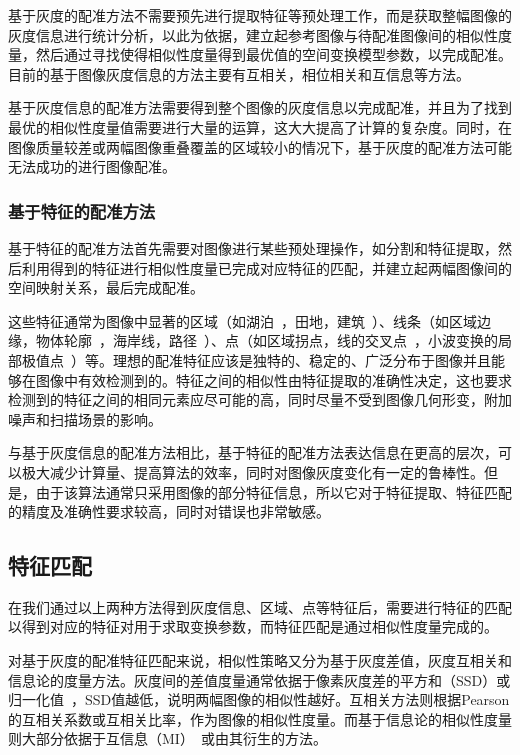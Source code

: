 基于灰度的配准方法不需要预先进行提取特征等预处理工作，而是获取整幅图像的灰度信息进行统计分析，以此为依据，建立起参考图像与待配准图像间的相似性度量，然后通过寻找使得相似性度量得到最优值的空间变换模型参数，以完成配准。目前的基于图像灰度信息的方法主要有互相关，相位相关和互信息等方法。

基于灰度信息的配准方法需要得到整个图像的灰度信息以完成配准，并且为了找到最优的相似性度量值需要进行大量的运算，这大大提高了计算的复杂度。同时，在图像质量较差或两幅图像重叠覆盖的区域较小的情况下，基于灰度的配准方法可能无法成功的进行图像配准。

\subsubsection{ 基于特征的配准方法}

基于特征的配准方法首先需要对图像进行某些预处理操作，如分割和特征提取，然后利用得到的特征进行相似性度量已完成对应特征的匹配，并建立起两幅图像间的空间映射关系，最后完成配准。

这些特征通常为图像中显著的区域（如湖泊~\cite{helm}，田地，建筑~\cite{hsieh}）、线条（如区域边缘，物体轮廓~\cite{dai}，海岸线，路径~\cite{li}）、点（如区域拐点，线的交叉点~\cite{stock}，小波变换的局部极值点~\cite{serief}）等。理想的配准特征应该是独特的、稳定的、广泛分布于图像并且能够在图像中有效检测到的。特征之间的相似性由特征提取的准确性决定，这也要求检测到的特征之间的相同元素应尽可能的高，同时尽量不受到图像几何形变，附加噪声和扫描场景的影响。

与基于灰度信息的配准方法相比，基于特征的配准方法表达信息在更高的层次，可以极大减少计算量、提高算法的效率，同时对图像灰度变化有一定的鲁棒性。但是，由于该算法通常只采用图像的部分特征信息，所以它对于特征提取、特征匹配的精度及准确性要求较高，同时对错误也非常敏感。

\subsection{特征匹配}
在我们通过以上两种方法得到灰度信息、区域、点等特征后，需要进行特征的匹配以得到对应的特征对用于求取变换参数，而特征匹配是通过相似性度量完成的。

对基于灰度的配准特征匹配来说，相似性策略又分为基于灰度差值，灰度互相关和信息论的度量方法。灰度间的差值度量通常依据于像素灰度差的平方和（SSD）或归一化值~\cite{ashb}，SSD值越低，说明两幅图像的相似性越好。互相关方法则根据Pearson的互相关系数或互相关比率，作为图像的相似性度量。而基于信息论的相似性度量则大部分依据于互信息（MI）~\cite{viola}或由其衍生的方法。

